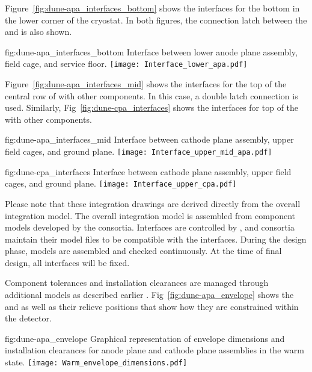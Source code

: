 Figure~\ref{fig:dune-apa_interfaces_bottom} shows the interfaces for
the bottom  in the lower corner of the cryostat. In both figures,
the connection latch between the  and  is also
shown.
\begin{dunefigure}{fig:dune-apa_interfaces_bottom}
  {Interface between lower anode plane assembly, field cage, and
    service floor.}
  \texttt{[image: Interface\_lower\_apa.pdf]}
\end{dunefigure}


Figure~\ref{fig:dune-apa_interfaces_mid} shows the interfaces for the
top of the central row of  with other components. In this case, a
double latch connection is used. Similarly,
Fig~\ref{fig:dune-cpa_interfaces} shows the interfaces for top of the
 with other components.
\begin{dunefigure}{fig:dune-apa_interfaces_mid}
  {Interface between cathode plane assembly, upper field cages, and ground plane.}
  \texttt{[image: Interface\_upper\_mid\_apa.pdf]}
\end{dunefigure}
\begin{dunefigure}{fig:dune-cpa_interfaces}
  {Interface between cathode plane assembly, upper field cages, and ground plane.}
  \texttt{[image: Interface\_upper\_cpa.pdf]}
\end{dunefigure}


Please note that these integration drawings are derived directly
from the overall integration model. The overall integration model is
assembled from component models developed by the
consortia. Interfaces are controlled by , and
consortia maintain their model files to be
compatible with the interfaces. During the design phase, models are
assembled and checked continuously. At the time of final design, all
interfaces will be fixed.


Component tolerances and installation clearances are managed through
additional models as described earlier  .
Fig~\ref{fig:dune-apa_envelope} shows the
 and  as well as their
relieve positions that show how they are constrained within the
detector.
\begin{dunefigure}{fig:dune-apa_envelope} {Graphical
    representation of envelope dimensions and installation clearances
    for anode plane and cathode plane assemblies in the warm state.}
  \texttt{[image: Warm\_envelope\_dimensions.pdf]}
\end{dunefigure}


